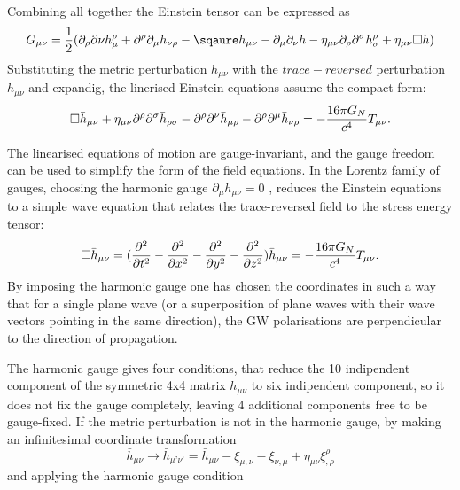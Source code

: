 \documentclass[binding=0.6cm, LaM]{sapthesis}
\begin{document}
Combining all together the Einstein tensor can be expressed as
\begin{equation}
G_{\mu\nu} = {1 \over 2}(\partial_{\rho}\partial{\nu}h^{\rho}_{\mu} + \partial^{\rho}\partial_{\mu}h_{\nu\rho} - \sqaure h_{\mu\nu} - \partial_{\mu}\partial_{\nu}h - \eta_{\mu\nu}\partial_{\rho}\partial^{\sigma}h^{\rho}_{\sigma} + \eta_{\mu\nu}\square h)
\end{equation}
Substituting the metric perturbation $h_{\mu\nu}$  with the $trace-reversed$ perturbation ${\bar h}_{\mu\nu}$ and expandig, the linerised Einstein equations assume the  compact form:
\begin{equation}
\square {\bar h}_{\mu\nu} + \eta_{\mu\nu}{\partial}^{\rho}{\partial}^{\sigma}{\bar h}_{\rho\sigma} - {\partial}^{\rho}{\partial}^{\nu}{\bar h}_{\mu\rho} - {\partial}^{\rho}{\partial}^{\mu}{\bar h}_{\nu\rho} = - {{16\pi G_{N}} \over {c^4}}T_{\mu\nu}.
\end{equation}


The linearised equations of motion are gauge-invariant, and the gauge freedom can
 be used to simplify the form of the field equations.
 In the Lorentz family of gauges, choosing the harmonic gauge 
 $ \partial_{\mu}h_{\mu\nu} = 0 $ 
 , reduces the Einstein equations to a simple wave equation that relates the trace-reversed field
 to the stress energy tensor:
\begin{equation}
\square {\bar h}_{\mu\nu} =({\partial^2 \over {\partial t^2} } - {\partial^2 \over {\partial x^2}}  - {\partial^2 \over {\partial y^2}}  -  {\partial^2 \over {\partial z^2}}) {\bar h}_{\mu\nu} = -{{16\pi G_{N}} \over {c^4}}T_{\mu\nu}. 
\end{equation}
By imposing the harmonic gauge one has chosen the coordinates in such a way that for a single plane wave (or a superposition of plane waves with their wave vectors pointing in the same direction), the GW polarisations are perpendicular to the direction of propagation.

The harmonic gauge gives four conditions, that reduce the 10 indipendent component of the symmetric 4x4 matrix $h_{\mu\nu}$ to six indipendent component, so it does not fix the gauge completely, leaving 4 additional components free to be gauge-fixed.  
If the metric perturbation is not in the harmonic gauge, by making an infinitesimal coordinate transformation 
\begin{equation}
{\bar h}_{\mu\nu} \rightarrow {\bar h}_{\mu’\nu’}  = {\bar h}_{\mu\nu}  - \xi_{\mu,\nu} -\xi_{\nu,\mu} + \eta_{\mu\nu}\xi^{\rho}_{,\rho}
\end{equation}
and applying the harmonic gauge condition
\end{document}
